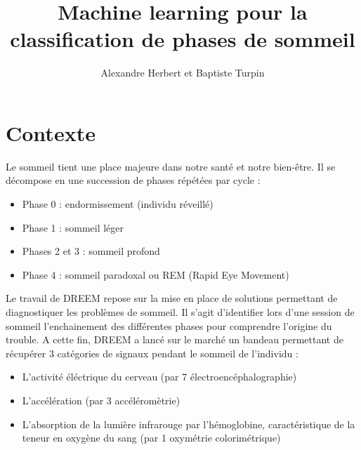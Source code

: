 \documentclass{article}
\title{Machine learning pour la classification de phases de sommeil}
\author{Alexandre Herbert et Baptiste Turpin}
\date{}
\begin{document}
\maketitle

\newpage

\setcounter{tocdepth}{2}
\renewcommand{\contentsname}{Sommaire}
\tableofcontents

\newpage

\section{Contexte}

Le sommeil tient une place majeure dans notre santé et notre bien-être. Il se décompose en une succession de phases répétées par cycle :
\\
\begin{itemize}
\item Phase 0 : endormissement (individu réveillé)
\item Phase 1 : sommeil léger
\item Phases 2 et 3 : sommeil profond
\item Phase 4 : sommeil paradoxal ou REM (Rapid Eye Movement)
\end{itemize}
\vspace{0.5cm}

Le travail de DREEM repose sur la mise en place de solutions permettant de diagnostiquer les problèmes de sommeil. Il s'agit d'identifier lors d'une session de sommeil l'enchainement des différentes phases pour comprendre l'origine du trouble. A cette fin, DREEM a lancé sur le marché un bandeau permettant de récupérer 3 catégories de signaux pendant le sommeil de l'individu :
\\
\begin{itemize}
\item L'activité éléctrique du cerveau (par 7 électroencéphalographie)
\item L'accélération (par 3 accéléromètrie)
\item L'absorption de la lumière infrarouge par l'hémoglobine, caractéristique de la teneur en oxygène du sang (par 1 oxymétrie colorimétrique)
\end{itemize}
\vspace{0.5cm}
\end{document}
